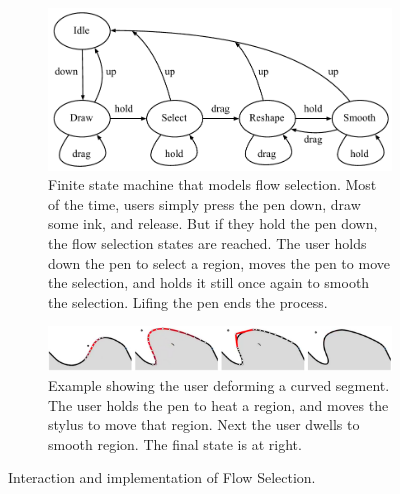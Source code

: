 \begin{figure}
  \centering
  \begin{subfigure}[t]{0.95\textwidth}
    \centering
    \includegraphics[width=0.5\linewidth]{img/flow-selection-fsm.pdf}
    \caption{Finite state machine that models flow
    selection. Most of the time, users simply press the pen down, draw
    some ink, and release. But if they hold the pen down, the flow
    selection states are reached. The user holds down the pen to
    select a region, moves the pen to move the selection, and holds it
    still once again to smooth the selection. Lifing the pen ends the
    process.}
    \label{fig:flow-selection-fsm}
  \end{subfigure}
  
  \vspace{5mm}
  \begin{subfigure}[t]{0.95\textwidth}
    \centering
    \includegraphics[width=\linewidth]{img/flow-selection-example.pdf}
    \caption{Example showing the user deforming a curved segment. The
      user holds the pen to heat a region, and moves the stylus to
      move that region. Next the user dwells to smooth region. The
      final state is at right.}
    \label{fig:flow-selection-example}
  \end{subfigure}
  \caption[Flow Selection]{Interaction and implementation of Flow Selection.}
  \label{fig:flow-selection}
\end{figure}
